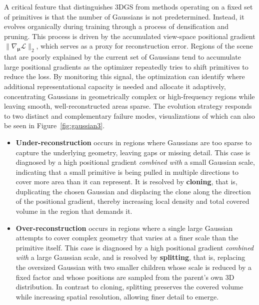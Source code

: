 A critical feature that distinguishes 3DGS from methods operating on a fixed set
of primitives is that the number of Gaussians is not predetermined. Instead, it
evolves organically during training through a process of densification and
pruning. This process is driven by the accumulated view-space positional
gradient $\|\nabla_{\boldsymbol{\mu}} \mathcal{L}\|_2$, which serves as a proxy
for reconstruction error. Regions of the scene that are poorly explained by the
current set of Gaussians tend to accumulate large positional gradients as the
optimizer repeatedly tries to shift primitives to reduce the loss. By monitoring
this signal, the optimization can identify where additional representational
capacity is needed and allocate it adaptively, concentrating
Gaussians in geometrically complex or high-frequency regions while leaving
smooth, well-reconstructed areas sparse. The evolution strategy responds to two
distinct and complementary failure modes, visualizations of which can also be
seen in Figure~\ref{fig:gaussian3}.
\begin{itemize}
    \item \textbf{Under-reconstruction} occurs in regions where Gaussians are
    too sparse to capture the underlying geometry, leaving gaps or missing
    detail. This case is diagnosed by a high positional gradient \emph{combined
    with} a small Gaussian scale, indicating that a small primitive is being
    pulled in multiple directions to cover more area than it can represent. It
    is resolved by \textbf{cloning}, that is, duplicating the chosen Gaussian
    and displacing the clone along the direction of the positional gradient,
    thereby increasing local density and total covered volume in the region that
    demands it.

    \item \textbf{Over-reconstruction} occurs in regions where a single large
    Gaussian attempts to cover complex geometry that varies at a finer scale
    than the primitive itself. This case is diagnosed by a high positional
    gradient \emph{combined with} a large Gaussian scale, and is resolved by
    \textbf{splitting}, that is, replacing the oversized Gaussian with two
    smaller children whose scale is reduced by a fixed factor and whose
    positions are sampled from the parent's own 3D distribution. In contrast to
    cloning, splitting preserves the covered volume while increasing spatial
    resolution, allowing finer detail to emerge.
\end{itemize}

